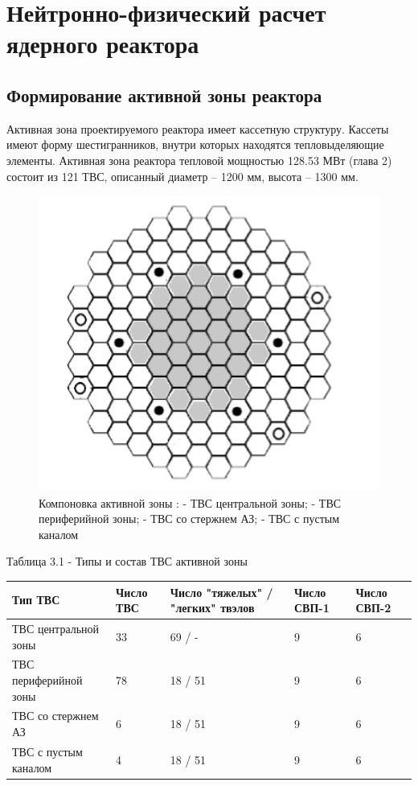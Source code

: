 ﻿\chapter{Нейтронно-физический расчет ядерного реактора}

\section{Формирование активной зоны реактора}

Активная зона проектируемого реактора имеет кассетную структуру. Кассеты
имеют форму шестигранников, внутри которых находятся тепловыделяющие
элементы. Активная зона реактора тепловой мощностью 128.53 МВт (глава 2)
состоит из 121 ТВС, описанный диаметр -- 1200 мм, высота -- 1300 мм.

\begin{figure}[!h]
\center
\includegraphics[width=4.43750in,height=3.83293in]{media/image12.png}
\caption{Компоновка активной зоны : - ТВС центральной зоны; - ТВС
периферийной зоны; - ТВС со стержнем АЗ; - ТВС с пустым каналом}
\end{figure}

Таблица 3.1 - Типы и состав ТВС активной зоны


\begin{longtable}[]{@{}lllll@{}}
\toprule
Тип ТВС & Число ТВС & Число "тяжелых" / "легких" твэлов & Число СВП-1 &
Число СВП-2\tabularnewline
\midrule
\endhead
ТВС центральной зоны & 33 & 69 / - & 9 & 6\tabularnewline
ТВС периферийной зоны & 78 & 18 / 51 & 9 & 6\tabularnewline
ТВС со стержнем АЗ & 6 & 18 / 51 & 9 & 6\tabularnewline
ТВС с пустым каналом & 4 & 18 / 51 & 9 & 6\tabularnewline
\bottomrule
\end{longtable}

